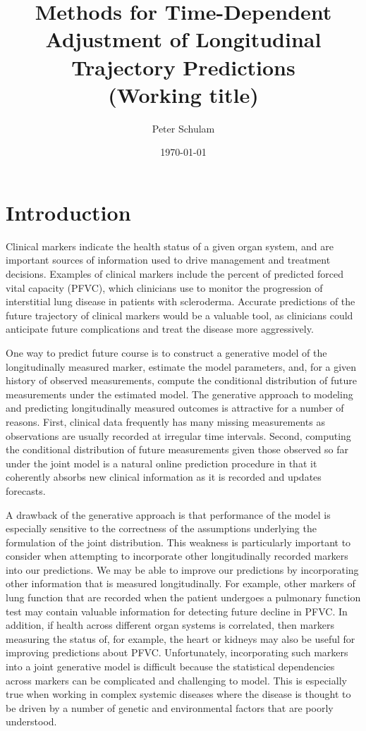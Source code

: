 \documentclass[12pt]{article}
\title{Methods for Time-Dependent Adjustment of Longitudinal Trajectory Predictions\\(Working title)}
\author{Peter Schulam}
\date{\today}
\begin{document}
\maketitle

\section{Introduction}

Clinical markers indicate the health status of a given organ system, and are important sources of information used to drive management and treatment decisions. Examples of clinical markers include the percent of predicted forced vital capacity (PFVC), which clinicians use to monitor the progression of interstitial lung disease in patients with scleroderma. Accurate predictions of the future trajectory of clinical markers would be a valuable tool, as clinicians could anticipate future complications and treat the disease more aggressively.

One way to predict future course is to construct a generative model of the longitudinally measured marker, estimate the model parameters, and, for a given history of observed measurements, compute the conditional distribution of future measurements under the estimated model. The generative approach to modeling and predicting longitudinally measured outcomes is attractive for a number of reasons. First, clinical data frequently has many missing measurements as observations are usually recorded at irregular time intervals. Second, computing the conditional distribution of future measurements given those observed so far under the joint model is a natural online prediction procedure in that it coherently absorbs new clinical information as it is recorded and updates forecasts.

A drawback of the generative approach is that performance of the model is especially sensitive to the correctness of the assumptions underlying the formulation of the joint distribution. This weakness is particularly important to consider when attempting to incorporate other longitudinally recorded markers into our predictions. We may be able to improve our predictions by incorporating other information that is measured longitudinally. For example, other markers of lung function that are recorded when the patient undergoes a pulmonary function test may contain valuable information for detecting future decline in PFVC. In addition, if health across different organ systems is correlated, then markers measuring the status of, for example, the heart or kidneys may also be useful for improving predictions about PFVC. Unfortunately, incorporating such markers into a joint generative model is difficult because the statistical dependencies across markers can be complicated and challenging to model. This is especially true when working in complex systemic diseases where the disease is thought to be driven by a number of genetic and environmental factors that are poorly understood.
\end{document}
